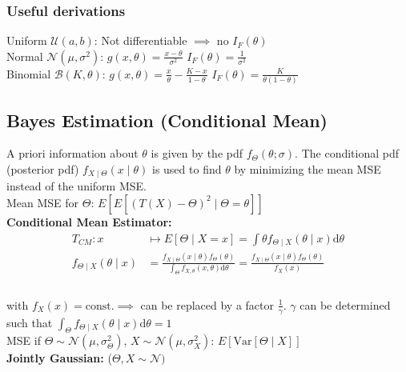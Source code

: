 \begin{mdframed}[style=eqbox]
  \subsubsection{Useful derivations}
  Uniform $\mathcal{U}(a,b)$: Not differentiable $\implies$ no $I_F(\theta)$\\[0.25em]
  Normal $\mathcal{N}(\mu, \sigma^2)$: $g(x,\theta) = \frac{x - \theta}{\sigma^2}$ $I_F(\theta) = \frac{1}{\sigma^2}$\\[0.25em]
  Binomial $\mathcal{B}(K, \theta)$: $g(x,\theta) = \frac{x}{\theta} - \frac{K-x}{1-\theta}$ $I_F(\theta) = \frac{K}{\theta(1-\theta)}$
\end{mdframed}
\begin{mdframed}[style=eqbox]
  \subsection{Bayes Estimation (Conditional Mean)}
  A priori information about $\theta$ is given by the pdf $f_\Theta(\theta; \sigma)$. The conditional pdf (posterior pdf) $f_{X\mid\Theta}(x\mid\theta)$ is used to find $\theta$ by minimizing the mean MSE instead of the uniform MSE.\\[0.25em]
  Mean MSE for $\Theta$: $E[E[(T(X) - \Theta)^2 \mid \Theta = \theta]]$ \\[0.25em]
  \textbf{Conditional Mean Estimator:}
  \vspace*{-4pt}
  \begin{align*}
    T_{CM} : x &\mapsto E[\Theta \mid X = x] = \int \theta f_{\Theta \mid X}(\theta \mid x) \text{d}\theta\\
    f_{\Theta \mid X}(\theta \mid x) &= \frac{f_{X \mid \Theta}(x \mid \theta) f_\Theta(\theta)}{\int_\Theta f_{X, \theta}(x, \theta)\text{d}\theta} = \frac{f_{X \mid \Theta}(x \mid \theta) f_\Theta(\theta)}{f_X(x)}\\
  \end{align*}\vspace*{-24pt}\\
  \small{with $f_X(x) = \text{const.} \implies$ can be replaced by a factor $\frac{1}{\gamma}$. $\gamma$ can be determined such that $\int_\Theta f_{\Theta \mid X}(\theta \mid x)\text{d}\theta = 1$}\normalsize\\[0.5em]
  MSE if $\Theta \sim \mathcal{N}(\mu, \sigma_\Theta^2)$, $X \sim \mathcal{N}(\mu, \sigma_X^2)$: $E[\text{Var}[\Theta \mid X]]$ \\[0.5em]
  \textbf{Jointly Gaussian:} ($\Theta, X \sim \mathcal{N})$

\end{mdframed}
